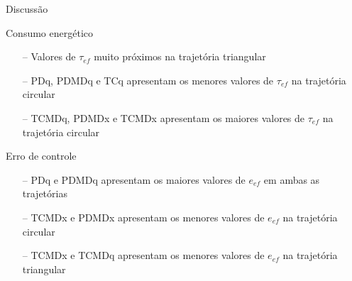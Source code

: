 \documentclass[25pt,landscape]{beamer}
\begin{document}
\begin{frame}{Discussão}
    \begin{block}{Consumo energético}
        \begin{itemize}
            \item[--] Valores de $\tau_{ef}$ muito próximos na trajetória triangular \\[4pt]
            \item[--] PDq, PDMDq e TCq apresentam os menores valores de $\tau_{ef}$ na trajetória circular \\[4pt]
            \item[--] TCMDq, PDMDx e TCMDx apresentam os maiores valores de $\tau_{ef}$ na trajetória circular \\[4pt]
        \end{itemize}
    \end{block}
    \pause
    \begin{block}{Erro de controle}
        \begin{itemize}
            \item[--] PDq e PDMDq apresentam os maiores valores de $e_{ef}$ em ambas as trajetórias \\[4pt]
            \item[--] TCMDx e PDMDx apresentam os menores valores de $e_{ef}$ na trajetória circular \\[4pt]
            \item[--] TCMDx e TCMDq apresentam os menores valores de $e_{ef}$ na trajetória triangular \\[4pt]
        \end{itemize}
    \end{block}
\end{frame}












\end{document}
